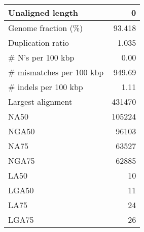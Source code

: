 \documentclass[12pt,a4paper]{article}
\begin{document}
\begin{table}[ht]
\begin{center}
\begin{tabular}{|l*{1}{|r}|}
Unaligned length & 0 \\ \hline
Genome fraction (\%) & 93.418 \\ \hline
Duplication ratio & 1.035 \\ \hline
\# N's per 100 kbp & 0.00 \\ \hline
\# mismatches per 100 kbp & 949.69 \\ \hline
\# indels per 100 kbp & 1.11 \\ \hline
Largest alignment & 431470 \\ \hline
NA50 & 105224 \\ \hline
NGA50 & 96103 \\ \hline
NA75 & 63527 \\ \hline
NGA75 & 62885 \\ \hline
LA50 & 10 \\ \hline
LGA50 & 11 \\ \hline
LA75 & 24 \\ \hline
LGA75 & 26 \\ \hline
\end{tabular}
\end{center}
\end{table}
\end{document}
